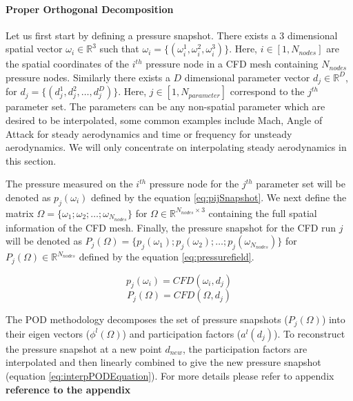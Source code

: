 \paragraph{Proper Orthogonal Decomposition}
Let us first start by defining a pressure snapshot. There exists a \(3\) dimensional spatial vector \(\omega_{i} \in  \mathbb{R}^{3}\) such that \(\omega_{i} = \{(\omega_{i}^{1}, \omega_{i}^{2}, \omega_{i}^{3})\}\). Here, \(i \in [1,N_{nodes}] \) are the spatial coordinates of the \(i^{th}\) pressure node in a CFD mesh containing \(N_{nodes}\) pressure nodes. Similarly there exists a \(D\) dimensional parameter vector \(d_{j} \in  \mathbb{R}^{D}\), for \(d_{j} = \{(d_{j}^{1}, d_{j}^{2}, \ldots ,d_{j}^{D})\}\). Here,   \(j \in [1,N_{parameter}] \) correspond to the \(j^{th}\) parameter set. The parameters can be any non-spatial parameter which are desired to be interpolated, some common examples include Mach, Angle of Attack for steady aerodynamics and time or frequency for unsteady aerodynamics. We will only concentrate on interpolating steady aerodynamics in this section.

The pressure measured on the \(i^{th}\) pressure node for the \(j^{th}\) parameter set will be denoted as \(p_{j}(\omega_{i})\) defined by the equation \ref{eq:pijSnapshot}. We next define the matrix \(\Omega = \{\omega_{1}; \omega_{2}; \ldots ; \omega_{N_{nodes}}\}\) for \(\Omega \in \mathbb{R}^{N_{nodes} \times 3}\) containing the full spatial information of the CFD mesh. Finally, the pressure snapshot for the CFD run \(j\) will be denoted as \(P_{j}(\Omega) = \{p_{j}(\omega_{1}); p_{j}(\omega_{2}); \ldots ; p_{j}(\omega_{N_{nodes}})\}\) for \(P_{j}(\Omega) \in \mathbb{R}^{N_{nodes}}\) defined by the equation \ref{eq:pressurefield}.

\begin{equation} \label{eq:pijSnapshot}
p_{j}(\omega_{i}) = CFD(\omega_{i}, d_{j})
\end{equation} 
\begin{equation}\label{eq:pressurefield}
P_{j}(\Omega) = CFD(\Omega, d_{j})
\end{equation} 

The POD methodology decomposes the set of pressure snapshots ($P_{j}(\Omega)$) into their eigen vectors ($\phi^{l}(\Omega)$) and participation factors ($a^{l}(d_{j})$). To reconstruct the pressure snapshot at a new point $d_{new}$, the participation factors are interpolated and then linearly combined to give the new pressure snapshot (equation \ref{eq:interpPODEquation}). For more details please refer to appendix \textbf{reference to the appendix}

